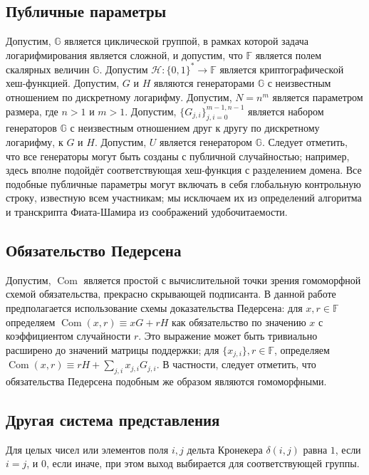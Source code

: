 \documentclass{article}
\newcommand{\F}{\mathbb{F}}
\newcommand{\com}{\operatorname{Com}}
\newcommand{\hs}{\mathcal{H}}
\theoremstyle{definition}
\begin{document}
\subsection{Публичные параметры}
Допустим, \begin{math}\mathbb{G}\end{math} является циклической группой, в рамках которой задача логарифмирования является сложной, и допустим, что $\F$ является полем скалярных величин \begin{math}\mathbb{G}\end{math}.
Допустим $\hs: \{0,1\}^* \to \F$ является криптографической хеш-функцией. Допустим, $G$ и $H$ являются генераторами \begin{math}\mathbb{G}\end{math} с неизвестным отношением по дискретному логарифму.
Допустим, $N = n^m$ является параметром размера, где $n > 1$ и $m > 1$.
Допустим, $\{G_{j,i}\}_{j,i=0}^{m-1,n-1}$ является набором генераторов \begin{math}\mathbb{G}\end{math} с неизвестным отношением друг к другу по дискретному логарифму, к $G$ и $H$.
Допустим, $U$ является генератором \begin{math}\mathbb{G}\end{math}.
Следует отметить, что все генераторы могут быть созданы с публичной случайностью; например, здесь вполне подойдёт соответствующая хеш-функция с разделением домена.
Все подобные публичные параметры могут включать в себя глобальную контрольную строку, известную всем участникам; мы исключаем их из определений алгоритма и транскрипта Фиата-Шамира из соображений удобочитаемости.


\subsection{Обязательство Педерсена}
Допустим, $\com$ является простой с вычислительной точки зрения гомоморфной схемой обязательства, прекрасно скрывающей подписанта. В данной работе предполагается использование схемы доказательства Педерсена: для $x,r \in \F$ определяем $\com(x,r) \equiv xG + rH$ как обязательство по значению $x$ с коэффициентом случайности $r$.
Это выражение может быть тривиально расширено до значений матрицы поддержки; для $\{x_{j,i}\},r \in \F$, определяем $\com(x,r) \equiv rH + \sum_{j,i} x_{j,i}G_{j,i}$.
В частности, следует отметить, что обязательства Педерсена подобным же образом являются гомоморфными.


\subsection{Другая система представления}
Для целых чисел или элементов поля $i,j$ дельта Кронекера $\delta(i,j)$ равна $1$, если $i=j$, и $0$, если иначе, при этом выход выбирается для соответствующей группы.
\end{document}
